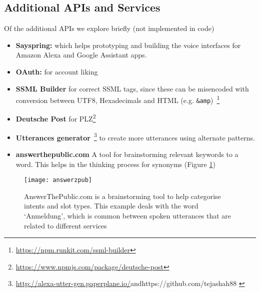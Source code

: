 \subsection*{Additional APIs and Services}
Of the additional APIs we explore briefly (not implemented in code) %
\begin{itemize}
	\itemsep0em
	\item \textbf{Sayspring:} which helps prototyping and building the voice interfaces for Amazon Alexa and Google Assistant apps.
	\item \textbf{OAuth:} for account liking 
\item \textbf{SSML Builder} for correct SSML tags, since these can be misencoded with conversion between UTF8, Hexadecimals and HTML (e.g. \texttt{&amp})~\footnote{\url{https://npm.runkit.com/ssml-builder}}
\item \textbf{Deutsche Post} for PLZ\footnote{\url{https://www.npmjs.com/package/deutsche-post}}
\item \textbf{Utterances generator}~\footnote{\url{http://alexa-utter-gen.paperplane.io/}and{https://github.com/tejashah88
}} to create more utterances using alternate patterns.


\item \textbf{answerthepublic.com} A tool for brainstorming relevant keywords to a word. This helps in the thinking process for synonyms (Figure \ref{answerzpb})
\end{itemize}





\begin{figure}[H]
	\caption[Brainstorming Tool Example]{AnswerThePublic.com is a brainstorming tool to help categorise intents and slot types. This example deals with the word `Anmeldung', which is common between spoken utterances that are related to different services}
	\label{answerzpb}
	\texttt{[image: answerzpub]}
\end{figure}


